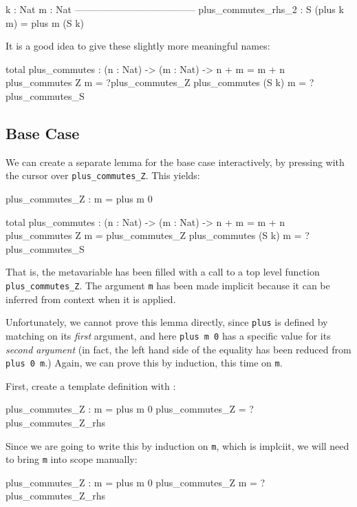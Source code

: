 \begin{code}
  k : Nat
  m : Nat
--------------------------------------
plus_commutes_rhs_2 : S (plus k m) = plus m (S k)
\end{code}

\noindent
It is a good idea to give these slightly more meaningful names:

\begin{code}
total
plus_commutes : (n : Nat) -> (m : Nat) -> n + m = m + n
plus_commutes Z m = ?plus_commutes_Z
plus_commutes (S k) m = ?plus_commutes_S
\end{code}

\subsection{Base Case}

We can create a separate lemma for the base case interactively, by pressing
\mklem{} with the cursor over \texttt{plus\_commutes\_Z}.
This yields:

\begin{code}
plus_commutes_Z : m = plus m 0

total
plus_commutes : (n : Nat) -> (m : Nat) -> n + m = m + n
plus_commutes Z m = plus_commutes_Z
plus_commutes (S k) m = ?plus_commutes_S
\end{code}

\noindent
That is, the metavariable has been filled with a call to a top level function
\texttt{plus\_commutes\_Z}. The argument \texttt{m} has been made implicit
because it can be inferred from context when it is applied.

Unfortunately, we cannot prove this lemma directly, since \texttt{plus} is
defined by matching on its \emph{first} argument, and here \texttt{plus m 0}
has a specific value for its \emph{second argument} (in fact, the left hand
side of the equality has been reduced from \texttt{plus 0 m}.) Again, we
can prove this by induction, this time on \texttt{m}.

First, create a template definition with \mkdef{}:

\begin{code}
plus_commutes_Z : m = plus m 0
plus_commutes_Z = ?plus_commutes_Z_rhs
\end{code}

\noindent
Since we are going to write this by induction on \texttt{m}, which is
implciit, we will need to bring \texttt{m} into scope manually:

\begin{code}
plus_commutes_Z : m = plus m 0
plus_commutes_Z {m} = ?plus_commutes_Z_rhs
\end{code}

